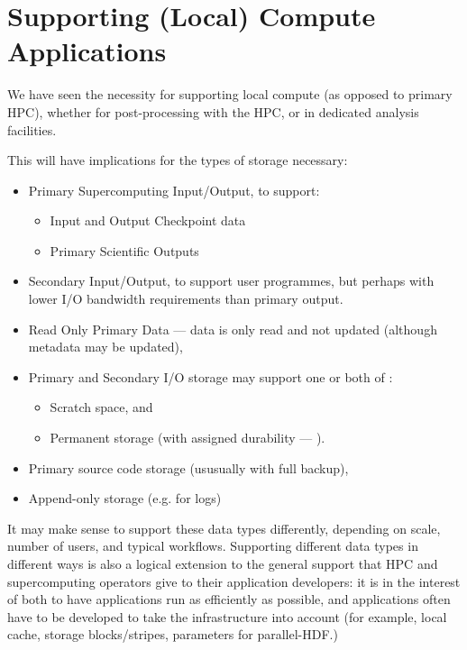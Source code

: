 \section{Supporting (Local) Compute Applications}

We have seen the necessity for supporting local compute (as opposed to
primary HPC), whether for post-processing with the HPC, or in dedicated
analysis facilities.

This will have implications for the types of storage necessary:
\begin{itemize}
\item Primary Supercomputing Input/Output, to support:
\begin{itemize}
    \item Input and Output Checkpoint data
    \item Primary Scientific Outputs
\end{itemize}
\item Secondary Input/Output, to support user programmes, but perhaps
with lower I/O bandwidth requirements than primary output.
\item Read Only Primary Data --- data is only read and not updated (although
metadata may be updated),
\item Primary and Secondary I/O storage may support one or both of :
\begin{itemize}
\item Scratch space, and
\item Permanent storage (with assigned durability --- ).
\end{itemize}
\item Primary source code storage (ususually with full backup),
\item Append-only storage (e.g. for logs)
\end{itemize}
It may make sense to support these data types differently, depending on
scale, number of users, and typical workflows. Supporting different data
types in different ways is also a logical extension to the general support that
HPC and supercomputing operators give to their application developers: it is in
the interest of both to have applications run as efficiently as possible, and
applications often have to be developed to take the infrastructure into account
(for example, local cache, storage blocks/stripes, parameters for parallel-HDF.)

